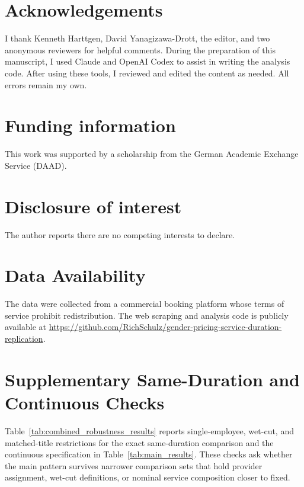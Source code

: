 \documentclass[12pt,a4paper]{article}
\begin{document}

\section*{Acknowledgements}
I thank Kenneth Harttgen, David Yanagizawa-Drott, the editor, and two anonymous reviewers for helpful comments. During the preparation of this manuscript, I used Claude and OpenAI Codex to assist in writing the analysis code. After using these tools, I reviewed and edited the content as needed. All errors remain my own.

\section*{Funding information}
This work was supported by a scholarship from the German Academic Exchange Service (DAAD).

\section*{Disclosure of interest}
The author reports there are no competing interests to declare.

\section*{Data Availability}
The data were collected from a commercial booking platform whose terms of service prohibit redistribution. The web scraping and analysis code is publicly available at \url{https://github.com/RichSchulz/gender-pricing-service-duration-replication}.






\newpage
\appendix
\section{Supplementary Same-Duration and Continuous Checks}
\label{app:robustness}

Table~\ref{tab:combined_robustness_results} reports single-employee, wet-cut, and matched-title restrictions for the exact same-duration comparison and the continuous specification in Table~\ref{tab:main_results}. These checks ask whether the main pattern survives narrower comparison sets that hold provider assignment, wet-cut definitions, or nominal service composition closer to fixed.
\end{document}
